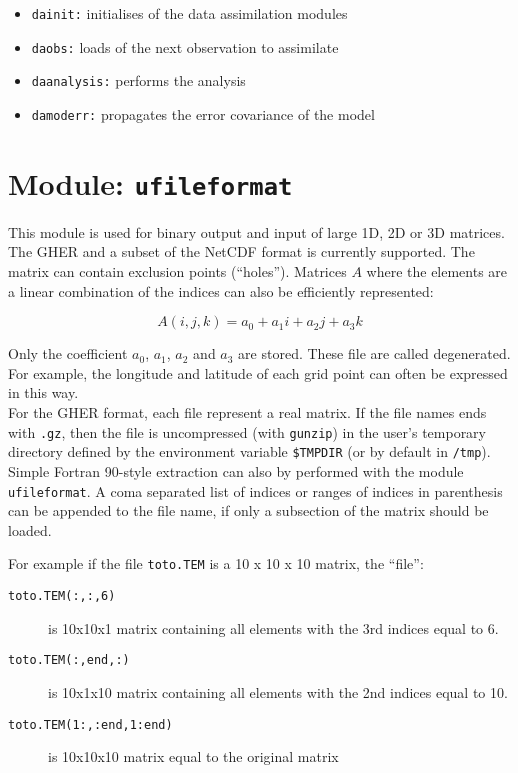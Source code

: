 \documentclass[a4paper,12pt]{article}
\newcommand{\code}{\texttt}
\begin{document}
\begin{itemize}
\item \code{dainit:} initialises of the data assimilation modules
\item \code{daobs:} loads of the next observation to assimilate
\item \code{daanalysis:} performs the analysis
\item \code{damoderr:} propagates the error covariance of the model 
\end{itemize}

\section{Module: \code{ufileformat}}\label{subsec_use_ufileformat}

This module is used for binary output and input of large 1D, 2D or 3D
matrices. The GHER and a subset of the NetCDF format is currently
supported. The matrix can contain exclusion points
(``holes''). Matrices $A$ where the elements are a linear combination of
the indices can also be efficiently represented: 

\begin{equation}
A(i,j,k) = a_0 + a_1 i + a_2 j + a_3 k
\end{equation}

Only the coefficient $a_0$, $a_1$, $a_2$ and $a_3$ are
stored. These file are called degenerated. For example, the longitude and latitude of each grid point can
often be expressed in this way.\\

For the GHER format, each file represent a real matrix. If the
file names ends with \code{.gz}, then the file is uncompressed
(with \code{gunzip}) in the user's temporary directory defined by the
environment variable \code{\$TMPDIR} (or by default in
\code{/tmp}). Simple Fortran 90-style extraction can also by performed
with the module \code{ufileformat}. A coma separated
list of indices or ranges of indices in parenthesis can be appended to
the file name, if only a subsection of the matrix should be loaded.

For example if the file
\code{toto.TEM} is a 10 x 10 x 10 matrix, the ``file'':

\begin{description}
\item[\code{toto.TEM(:,:,6)}] is 10x10x1 matrix containing all
  elements with the 3rd indices equal to 6.
\item[\code{toto.TEM(:,end,:)}] is 10x1x10 matrix containing all
  elements with the 2nd indices equal to 10.
\item[\code{toto.TEM(1:,:end,1:end)}] is 10x10x10 matrix equal to the
  original matrix
\end{description}
\end{document}

